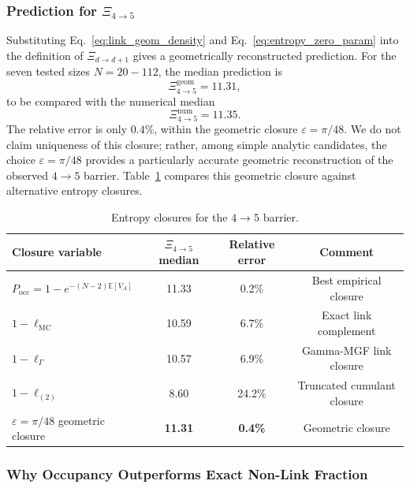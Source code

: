\documentclass[12pt,a4paper]{article}
\begin{document}
\subsubsection{Prediction for $\Xi_{4\to5}$}
\label{sec:ordering_fraction}

Substituting Eq.~\eqref{eq:link_geom_density} and Eq.~\eqref{eq:entropy_zero_param}
into the definition of $\Xi_{d\to d+1}$ gives a geometrically reconstructed prediction.
For the seven tested sizes $N = 20{-}112$, the median prediction is
\begin{equation}
\Xi_{4\to5}^{\mathrm{geom}} = 11.31,
\end{equation}
to be compared with the numerical median
\begin{equation}
\Xi_{4\to5}^{\mathrm{num}} = 11.35.
\end{equation}
The relative error is only $0.4\%$, within the geometric closure
$\varepsilon = \pi/48$.
We do not claim uniqueness of this closure; rather, among simple analytic
candidates, the choice $\varepsilon = \pi/48$ provides a particularly accurate
geometric reconstruction of the observed $4{\to}5$ barrier.
Table~\ref{tab:xi_prediction} compares this geometric closure against
alternative entropy closures.

\begin{table}[htbp]
\centering
\caption{Entropy closures for the $4{\to}5$ barrier.}
\label{tab:xi_prediction}
\begin{tabular}{@{}lccc@{}}
\toprule
Closure variable & $\Xi_{4\to5}$ median & Relative error & Comment \\
\midrule
$P_{\mathrm{occ}} = 1-e^{-(N-2)\mathbb{E}[V_A]}$ & 11.33 & 0.2\% & Best empirical closure \\
$1-\ell_{\mathrm{MC}}$ & 10.59 & 6.7\% & Exact link complement \\
$1-\ell_{\Gamma}$ & 10.57 & 6.9\% & Gamma-MGF link closure \\
$1-\ell_{(2)}$ & 8.60 & 24.2\% & Truncated cumulant closure \\
$\varepsilon = \pi/48$ geometric closure & \textbf{11.31} & \textbf{0.4\%} & Geometric closure \\
\bottomrule
\end{tabular}
\end{table}

\subsubsection{Why Occupancy Outperforms Exact Non-Link Fraction}
\label{sec:prediction_stability}
\end{document}
